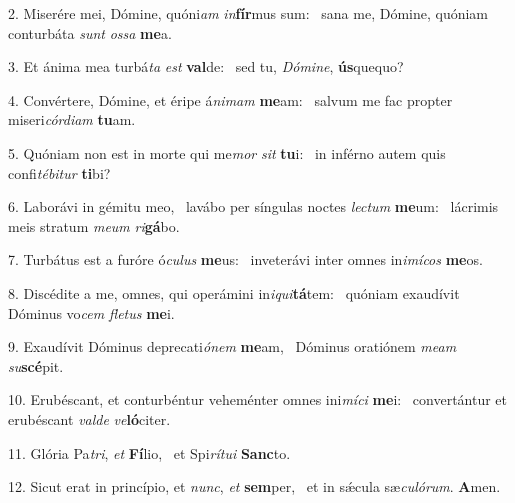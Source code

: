 2. Miserére mei, Dómine, quóni\textit{am} \textit{in}\textbf{fír}mus sum: \ast\  sana me, Dómine, quóniam conturbáta \textit{sunt} \textit{os}\textit{sa} \textbf{me}a.\

3. Et ánima mea turbá\textit{ta} \textit{est} \textbf{val}de: \ast\  sed tu, \textit{Dó}\textit{mi}\textit{ne}, \textbf{ús}quequo?\

4. Convértere, Dómine, et éripe á\textit{ni}\textit{mam} \textbf{me}am: \ast\  salvum me fac propter miseri\textit{cór}\textit{di}\textit{am} \textbf{tu}am.\

5. Quóniam non est in morte qui me\textit{mor} \textit{sit} \textbf{tu}i: \ast\  in inférno autem quis confi\textit{té}\textit{bi}\textit{tur} \textbf{ti}bi?\

6. Laborávi in gémitu meo, \dag\  lavábo per síngulas noctes \textit{lec}\textit{tum} \textbf{me}um: \ast\  lácrimis meis stratum \textit{me}\textit{um} \textit{ri}\textbf{gá}bo.\

7. Turbátus est a furóre ó\textit{cu}\textit{lus} \textbf{me}us: \ast\  inveterávi inter omnes in\textit{i}\textit{mí}\textit{cos} \textbf{me}os.\

8. Discédite a me, omnes, qui operámini in\textit{i}\textit{qui}\textbf{tá}tem: \ast\  quóniam exaudívit Dóminus vo\textit{cem} \textit{fle}\textit{tus} \textbf{me}i.\

9. Exaudívit Dóminus deprecati\textit{ó}\textit{nem} \textbf{me}am, \ast\  Dóminus oratiónem \textit{me}\textit{am} \textit{su}\textbf{scé}pit.\

10. Erubéscant, et conturbéntur veheménter omnes ini\textit{mí}\textit{ci} \textbf{me}i: \ast\  convertántur et erubéscant \textit{val}\textit{de} \textit{ve}\textbf{ló}citer.\

11. Glória Pa\textit{tri}, \textit{et} \textbf{Fí}lio, \ast\  et Spi\textit{rí}\textit{tu}\textit{i} \textbf{Sanc}to.\

12. Sicut erat in princípio, et \textit{nunc}, \textit{et} \textbf{sem}per, \ast\  et in sǽcula sæ\textit{cu}\textit{ló}\textit{rum}. \textbf{A}men.\

